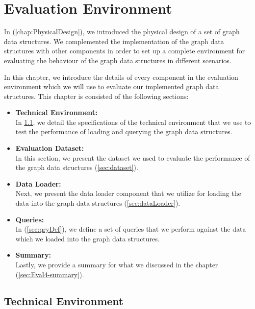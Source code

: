 {\chapter{Evaluation Environment}
\label{chap:Eval_4}

In (\ref{chap:PhysicalDesign}), we introduced the physical design of a set of graph data structures. We complemented the implementation of the graph data structures with other components in order to set up a complete environment for evaluating the behaviour of the graph data structures in different scenarios. 

In this chapter, we introduce the details of every component in the evaluation environment which we will use to evaluate our implemented graph data structures. This chapter is consisted of the following sections:

\begin{itemize}  

\item \textbf{Technical Environment:}\\
In \ref{sec:techEnv}, we detail the specifications of the technical environment that we use to test the performance of loading and querying the graph data structures. 

\item \textbf{Evaluation Dataset:}\\
In this section, we present the dataset we used to evaluate the performance of the graph data structures (\ref{sec:dataset}).

\item \textbf{Data Loader:}\\
Next, we present the data loader component that we utilize for loading the data into the graph data structures (\ref{sec:dataLoader}).

\item \textbf{Queries:}\\
In (\ref{sec:qryDef}), we define a set of queries that we perform against the data which we loaded into the graph data structures.

\item \textbf{Summary:}\\
Lastly, we provide a summary for what we discussed in the chapter (\ref{sec:Eval4-summary}).

\end{itemize}


\section{Technical Environment}
\label{sec:techEnv}

}
